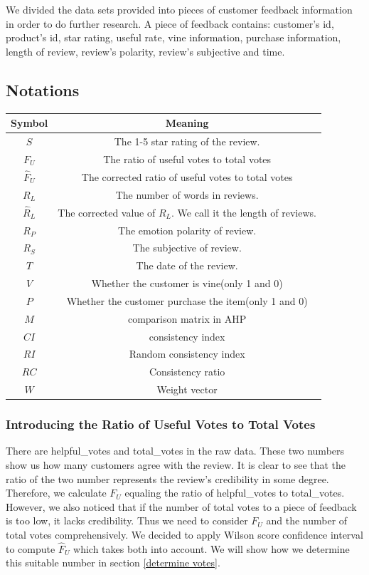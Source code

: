 \documentclass{mcmthesis}
\begin{document}
    We divided the data sets provided into pieces of customer feedback information in order to do further research. A piece of feedback contains: customer's id, product's id, star rating, useful rate, vine information, purchase information, length of review, review's polarity, review's subjective and time.

\subsection{Notations}
\begin{center}
    \begin{tabular}{cc}
        \hline\hline
        Symbol & Meaning \\
        \hline
         $S$ & The 1-5 star rating of the review. \\
         $F_U$ & The ratio of useful votes to total votes \\
         $\widehat F_U$ & The corrected ratio of useful votes to total votes\\
         $R_L$ & The number of words in reviews. \\
         $\widehat R_L$ & The corrected value of $R_L$. We call it the length of reviews.\\
         $R_P$ & The emotion polarity of review. \\
         $R_S$ & The subjective of review. \\
         $T$ & The date of the review. \\
         $V$ & Whether the customer is vine(only 1 and 0) \\
         $P$ & Whether the customer purchase the item(only 1 and 0) \\
         $M$ & comparison matrix in AHP\\
         $CI$ & consistency index\\
         $RI$ & Random consistency index\\
         $RC$ & Consistency ratio\\
         $W$ & Weight vector\\
        \hline\hline
    \end{tabular}
\end{center}


\subsubsection{Introducing the Ratio of Useful Votes to Total Votes}

    There are helpful\_votes and total\_votes in the raw data. These two numbers show us how many customers agree with the review. It is clear to see that the ratio of the two number represents the review's credibility in some degree. Therefore, we calculate $F_U$ equaling the ratio of helpful\_votes to total\_votes. However, we also noticed that if the number of total votes to a piece of feedback is too low, it lacks credibility. Thus we need to consider $F_U$ and the number of total votes comprehensively. We decided to apply Wilson score confidence interval to compute $\widehat F_U$ which takes both into account. We will show how we determine this suitable number in section \ref{determine votes}.
\end{document}

